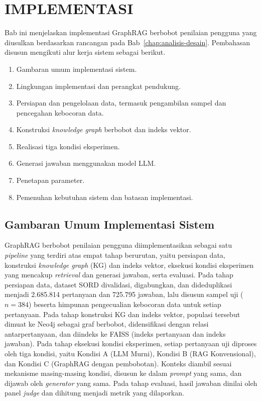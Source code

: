 
\chapter{IMPLEMENTASI}
\label{chap:implementasi}

Bab ini menjelaskan implementasi GraphRAG berbobot penilaian pengguna yang diusulkan berdasarkan rancangan pada Bab~\ref{chap:analisis-desain}. Pembahasan disusun mengikuti alur kerja sistem sebagai berikut.
\begin{enumerate}[1.]
    \item Gambaran umum implementasi sistem.
    \item Lingkungan implementasi dan perangkat pendukung.
    \item Persiapan dan pengelolaan data, termasuk pengambilan sampel dan pencegahan kebocoran data.
    \item Konstruksi \emph{knowledge graph} berbobot dan indeks vektor.
    \item Realisasi tiga kondisi eksperimen.
    \item Generasi jawaban menggunakan model LLM.
    \item Penetapan parameter.
    \item Pemenuhan kebutuhan sistem dan batasan implementasi.
\end{enumerate}

\section{Gambaran Umum Implementasi Sistem}
\label{sec:gambaran-implementasi}


GraphRAG berbobot penilaian pengguna diimplementasikan sebagai satu \emph{pipeline} yang terdiri atas empat tahap berurutan, yaitu persiapan data, konstruksi \emph{knowledge graph} (KG) dan indeks vektor, eksekusi kondisi eksperimen yang mencakup \emph{retrieval} dan generasi jawaban, serta evaluasi. Pada tahap persiapan data, dataset SORD divalidasi, digabungkan, dan dideduplikasi menjadi 2.685.814 pertanyaan dan 725.795 jawaban, lalu disusun sampel uji ($n{=}384$) beserta himpunan pengecualian kebocoran data untuk setiap pertanyaan. Pada tahap konstruksi KG dan indeks vektor, populasi tersebut dimuat ke Neo4j sebagai graf berbobot, didensifikasi dengan relasi antarpertanyaan, dan diindeks ke FAISS (indeks pertanyaan dan indeks jawaban). Pada tahap eksekusi kondisi eksperimen, setiap pertanyaan uji diproses oleh tiga kondisi, yaitu Kondisi A (LLM Murni), Kondisi B (RAG Konvensional), dan Kondisi C (GraphRAG dengan pembobotan). Konteks diambil sesuai mekanisme masing-masing kondisi, disusun ke dalam \emph{prompt} yang sama, dan dijawab oleh \emph{generator} yang sama. Pada tahap evaluasi, hasil jawaban dinilai oleh panel \emph{judge} dan dihitung menjadi metrik yang dilaporkan.

